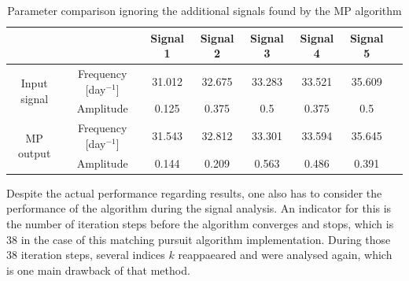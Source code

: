 \begin{table}[h!]
\centering
\begin{tabular}{ | c| c| c| c| c| c|c|c| }
\hline
	&   & Signal 1 & Signal 2 & Signal 3 & Signal 4 & Signal 5 \\ \hline
\multirow{2}{3cm}{Input signal} & Frequency [day$^{-1}$] & 31.012 & 32.675 & 33.283 & 33.521 & 35.609 \\ \cline{2-7}
 & Amplitude & 0.125 & 0.375 & 0.5 & 0.375 & 0.5 \\ \hline

\multirow{2}{3cm}{MP output} & Frequency [day$^{-1}$] &  31.543& 32.812 & 33.301 & 33.594 & 35.645 \\ \cline{2-7}
 & Amplitude &  0.144& 0.209& 0.563 & 0.486 & 0.391 \\ \hline

\end{tabular}
\caption{Parameter comparison ignoring the additional signals found by the MP algorithm}
\label{tab:mp}
\end{table}

Despite the actual performance regarding results, one also has to consider the performance of the algorithm during the signal analysis. An indicator for this is the number of iteration steps before the algorithm converges and stops, which is 38 in the case of this matching pursuit algorithm implementation. During those 38 iteration steps, several indices $k$ reappaeared and were analysed again, which is one main drawback of that method.





